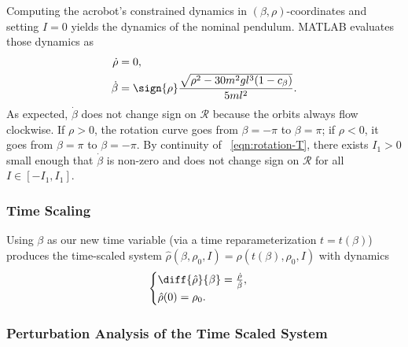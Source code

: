 Computing the acrobot's constrained dynamics in \((\beta,\rho)\)-coordinates and
setting \(I = 0\) yields the dynamics of the nominal pendulum.
MATLAB evaluates those dynamics as
\begin{align}\label{eqn:acrobot-rot-mu-dot-nom}
    \dot{\rho} &= 0
    , \\
    \label{eqn:acrobot-rot-alpha-dot-nom}
    \dot{\beta} &=  \sign{\rho} 
    \frac{\sqrt{\rho^2 - 30m^2gl^3(1 - c_\beta)}}{5ml^2}
    .
\end{align}
As expected, \(\dot{\beta}\) does not change sign on \(\mathcal{R}\) because the
orbits always flow clockwise.
If \(\rho > 0\), the rotation curve goes from \(\beta = -\pi\) to 
\(\beta = \pi\); 
if \(\rho < 0\), it goes from \(\beta = \pi\) to \(\beta = -\pi\).
By continuity of ~\eqref{eqn:rotation-T}, there exists \(I_1 > 0\) small enough
that \(\dot{\beta}\) is non-zero and does not change sign on \(\mathcal{R}\) for
all \(I \in [-I_1,I_1]\).

\subsubsection*{Time Scaling}

Using \(\beta\) as our new time variable (via a time reparameterization
\(t = t(\beta)\)) produces the time-scaled system
\(\hat{\rho}(\beta,\rho_0,I) = \rho(t(\beta),\rho_0,I)\) with dynamics
\[
    \begin{cases}
        \diff{\hat{\rho}}{\beta} = \frac{\dot{\rho}}{\dot{\beta}}
        , \\
        \hat{\rho}(0) = \rho_0
        .
    \end{cases}
\]

\subsubsection*{Perturbation Analysis of the Time Scaled System}

